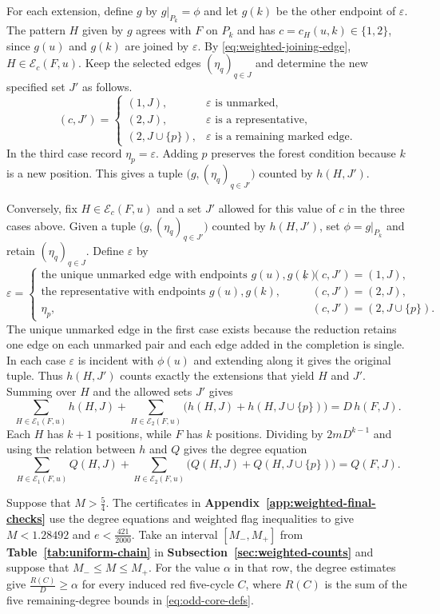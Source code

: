 \documentclass[preprint,11pt,numbers]{elsarticle-arxiv}
\numberwithin{equation}{section}
\theoremstyle{definition}
\begin{document}
For each extension, define $g$ by $g|_{P_k}=\phi$ and let $g(k)$
be the other endpoint of $\varepsilon$. The pattern $H$ given by
$g$ agrees with $F$ on $P_k$ and has $c=c_H(u,k)\in\{1,2\}$,
since $g(u)$ and $g(k)$ are joined by $\varepsilon$.
By \eqref{eq:weighted-joining-edge}, $H\in\mathcal E_c(F,u)$.
Keep the selected edges $(\eta_q)_{q\in J}$ and determine the new
specified set $J'$ as follows.
\[
 (c,J')=
 \begin{cases}
  (1,J), & \varepsilon\text{ is unmarked},\\
  (2,J), & \varepsilon\text{ is a representative},\\
  (2,J\cup\{p\}), & \varepsilon\text{ is a remaining marked edge}.
 \end{cases}
\]
In the third case record $\eta_p=\varepsilon$. Adding $p$ preserves
the forest condition because $k$ is a new position. This gives a
tuple $\bigl(g,(\eta_q)_{q\in J'}\bigr)$ counted by $h(H,J')$.

Conversely, fix $H\in\mathcal E_c(F,u)$ and a set $J'$ allowed
for this value of $c$ in the three cases above. Given a tuple
$\bigl(g,(\eta_q)_{q\in J'}\bigr)$ counted by $h(H,J')$, set
$\phi=g|_{P_k}$ and retain $(\eta_q)_{q\in J}$. Define
$\varepsilon$ by
\[
 \varepsilon=
 \begin{cases}
  \text{the unique unmarked edge with endpoints $g(u),g(k)$},
       &(c,J')=(1,J),\\
  \text{the representative with endpoints $g(u),g(k)$},
       &(c,J')=(2,J),\\
  \eta_p,&(c,J')=(2,J\cup\{p\}).
 \end{cases}
\]
The unique unmarked edge in the first case exists because the
reduction retains one edge on each unmarked pair and each edge
added in the completion is single. In each case $\varepsilon$ is
incident with $\phi(u)$ and extending along it gives the original
tuple. Thus $h(H,J')$ counts exactly the extensions that yield $H$
and $J'$. Summing over $H$ and the allowed sets $J'$ gives
\[
 \sum_{H\in\mathcal E_1(F,u)}h(H,J)
 +\sum_{H\in\mathcal E_2(F,u)}
  \bigl(h(H,J)+h(H,J\cup\{p\})\bigr)=D\,h(F,J).
\]
Each $H$ has $k+1$ positions, while $F$ has $k$ positions.
Dividing by $2mD^{k-1}$ and using the relation between $h$ and
$Q$ gives the degree equation
\[
 \sum_{H\in\mathcal E_1(F,u)}Q(H,J)
 +\sum_{H\in\mathcal E_2(F,u)}
  \bigl(Q(H,J)+Q(H,J\cup\{p\})\bigr)=Q(F,J).
\]

Suppose that $M>\frac{5}{4}$. The certificates in
\textbf{Appendix~\ref{app:weighted-final-checks}} use the degree
equations and weighted flag inequalities to give
$M<1.28492$ and $e<\frac{421}{2000}$.
Take an interval $[M_-,M_+]$ from
\textbf{Table~\ref{tab:uniform-chain}} in
\textbf{Subsection~\ref{sec:weighted-counts}} and suppose that
$M_-\leq M\leq M_+$. For the value $\alpha$ in that row, the
degree estimates give $\frac{R(C)}{D}\geq\alpha$ for every induced
red five-cycle $C$, where $R(C)$ is the sum of the five
remaining-degree bounds in \eqref{eq:odd-core-defs}.
\end{document}

